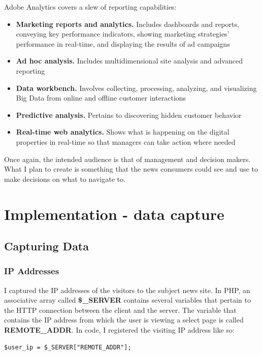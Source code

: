 \documentclass[12pt]{article}
\begin{document}
Adobe Analytics covers a slew of reporting capabilities:

\begin{itemize}
\item \textbf{Marketing reports and analytics.} Includes dashboards and reports, conveying key performance indicators, showing marketing strategies' performance in real-time, and displaying the results of ad campaigns
\item \textbf{Ad hoc analysis.} Includes multidimensional site analysis and advanced reporting
\item \textbf{Data workbench.} Involves collecting, processing, analyzing, and visualizing Big Data from online and offline customer interactions
\item \textbf{Predictive analysis.} Pertains to discovering hidden customer behavior
\item \textbf{Real-time web analytics.} Shows what is happening on the digital properties in real-time so that managers can take action where needed
\end{itemize}

Once again, the intended audience is that of management and decision makers. What I plan to create is something that the news consumers could see and use to make decisions on what to navigate to.

\null
\vfill


\section{Implementation - data capture}
\subsection{Capturing Data}
\subsubsection{IP Addresses}
I captured the IP addresses of the visitors to the subject news site. In PHP, an associative array called \textbf{\$\_SERVER}  contains several variables that pertain to the HTTP connection between the client and the server. The variable that contains the IP address from which the user is viewing a select page is called \textbf{REMOTE\_ADDR}. In code, I registered the visiting IP address like so:
\begin{lstlisting}
$user_ip = $_SERVER["REMOTE_ADDR"];
\end{lstlisting}
\end{document}
